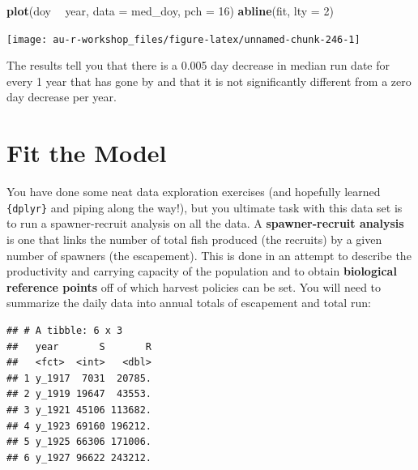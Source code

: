 \documentclass[]{book}
\newenvironment{Shaded}{\begin{snugshade}}{\end{snugshade}}
\newcommand{\KeywordTok}[1]{\textcolor[rgb]{0.13,0.29,0.53}{\textbf{#1}}}
\newcommand{\DataTypeTok}[1]{\textcolor[rgb]{0.13,0.29,0.53}{#1}}
\newcommand{\DecValTok}[1]{\textcolor[rgb]{0.00,0.00,0.81}{#1}}
\newcommand{\StringTok}[1]{\textcolor[rgb]{0.31,0.60,0.02}{#1}}
\newcommand{\OperatorTok}[1]{\textcolor[rgb]{0.81,0.36,0.00}{\textbf{#1}}}
\newcommand{\NormalTok}[1]{#1}
\theoremstyle{definition}
\theoremstyle{definition}
\theoremstyle{definition}
\theoremstyle{remark}
\begin{document}
\begin{Shaded}
\begin{Highlighting}[]
\KeywordTok{plot}\NormalTok{(doy }\OperatorTok{~}\StringTok{ }\NormalTok{year, }\DataTypeTok{data =}\NormalTok{ med_doy, }\DataTypeTok{pch =} \DecValTok{16}\NormalTok{)}
\KeywordTok{abline}\NormalTok{(fit, }\DataTypeTok{lty =} \DecValTok{2}\NormalTok{)}
\end{Highlighting}
\end{Shaded}

\begin{center}\texttt{[image: au-r-workshop\_files/figure-latex/unnamed-chunk-246-1]} \end{center}

The results tell you that there is a 0.005 day decrease in median run
date for every 1 year that has gone by and that it is not significantly
different from a zero day decrease per year.

\section{Fit the Model}\label{fit-the-model}

You have done some neat data exploration exercises (and hopefully
learned \texttt{\{dplyr\}} and piping along the way!), but you ultimate
task with this data set is to run a spawner-recruit analysis on all the
data. A \textbf{spawner-recruit analysis} is one that links the number
of total fish produced (the recruits) by a given number of spawners (the
escapement). This is done in an attempt to describe the productivity and
carrying capacity of the population and to obtain \textbf{biological
reference points} off of which harvest policies can be set. You will
need to summarize the daily data into annual totals of escapement and
total run:

\begin{Shaded}
\end{Shaded}

\begin{verbatim}
## # A tibble: 6 x 3
##   year       S       R
##   <fct>  <int>   <dbl>
## 1 y_1917  7031  20785.
## 2 y_1919 19647  43553.
## 3 y_1921 45106 113682.
## 4 y_1923 69160 196212.
## 5 y_1925 66306 171006.
## 6 y_1927 96622 243212.
\end{verbatim}
\end{document}
